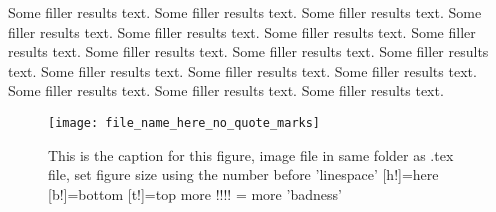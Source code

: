 \documentclass[11pt]{article}
\begin{document}
Some filler results text. Some filler results text. Some filler results text. Some filler results text. Some filler results text. Some filler results text. Some filler results text. Some filler results text. Some filler results text. Some filler results text. Some filler results text. Some filler results text. Some filler results text. Some filler results text. Some filler results text. Some filler results text. 

\begin{figure}
\texttt{[image: file\_name\_here\_no\_quote\_marks]}
\caption{This is the caption for this figure, image file in same folder as .tex file, set figure size using the number before 'linespace' [h!]=here [b!]=bottom [t!]=top more !!!! = more 'badness'}
\label{figure}
\end{figure}


\end{document}
